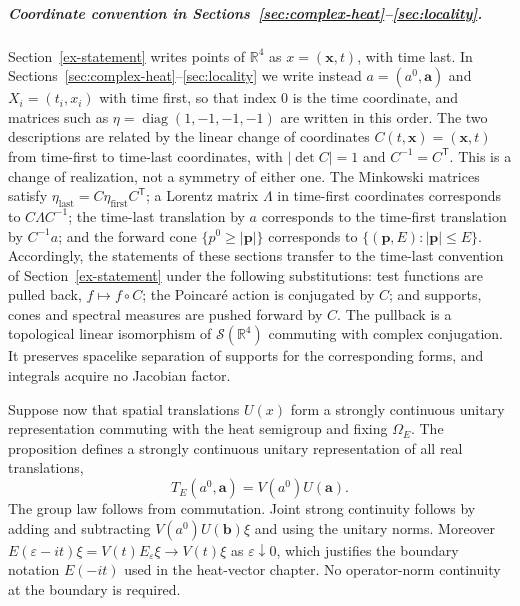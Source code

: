 \subparagraph{Coordinate convention in Sections~\ref{sec:complex-heat}--\ref{sec:locality}.}
Section~\ref{ex-statement} writes points of $\mathbb R^4$ as
$x=(\boldsymbol x,t)$, with time last. In
Sections~\ref{sec:complex-heat}--\ref{sec:locality} we write instead
$a=(a^0,\mathbf a)$ and $X_i=(t_i,x_i)$ with time first, so that index $0$
is the time coordinate, and matrices such as
$\eta=\operatorname{diag}(1,-1,-1,-1)$ are written in this order. The two
descriptions are related by the linear change of coordinates
$C(t,\mathbf x)=(\mathbf x,t)$ from time-first to time-last coordinates,
with $|\det C|=1$ and $C^{-1}=C^{\mathsf T}$. This is a change of
realization, not a symmetry of either one. The Minkowski matrices satisfy
$\eta_{\mathrm{last}}=C\eta_{\mathrm{first}}C^{\mathsf T}$; a Lorentz matrix
$\Lambda$ in time-first coordinates corresponds to $C\Lambda C^{-1}$; the
time-last translation by $a$ corresponds to the time-first translation by
$C^{-1}a$; and the forward cone $\{p^0\geq|\mathbf p|\}$ corresponds to
$\{(\mathbf p,E):|\mathbf p|\leq E\}$. Accordingly, the statements of
these sections transfer to the time-last convention of
Section~\ref{ex-statement} under the following substitutions: test
functions are pulled back, $f\mapsto f\circ C$; the Poincar\'e action is
conjugated by $C$; and supports, cones and spectral measures are pushed
forward by $C$. The pullback is a topological linear isomorphism of
$\mathcal S(\mathbb R^4)$ commuting with complex conjugation. It preserves
spacelike separation of supports for the corresponding forms, and integrals
acquire no Jacobian factor.

Suppose now that spatial translations $U(x)$ form a strongly continuous
unitary representation commuting with the heat semigroup and fixing
$\Omega_E$. The proposition
defines a strongly continuous unitary representation of all real translations,
\[
 T_E(a^0,\mathbf a)=V(a^0)U(\mathbf a).
\]
The group law follows from commutation. Joint strong continuity follows by
adding and subtracting $V(a^0)U(\mathbf b)\xi$ and using the unitary norms.
Moreover $E(\varepsilon-it)\xi=V(t)E_\varepsilon\xi\to V(t)\xi$ as
$\varepsilon\downarrow0$, which justifies the boundary notation $E(-it)$
used in the heat-vector chapter. No operator-norm continuity at the boundary
is required.

